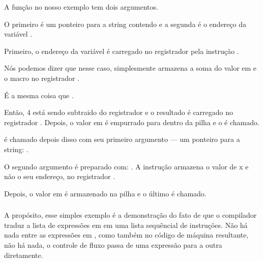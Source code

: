 A função \scanf no nosso exemplo tem dois argumentos.

O primeiro é um ponteiro para a string contendo  e a segunda é o endereço da variável .

Primeiro, o endereço da variável  é carregado no registrador \EAX pela instrução .

\ifx\LITE\undefined
\PTBRph{}
\fi

Nós podemos dizer que nesse caso, \LEA simplesmente armazena a soma do valor em \EBP e o macro  no registrador \EAX.

É a mesma coisa que .

Então, 4 está sendo subtraido do registrador \EBP e o resultado é carregado no registrador \EAX.
Depois, o valor em \EAX é empurrado para dentro da pilha e o \scanf é chamado.

\printf é chamado depois disso com seu primeiro argumento --- um ponteiro para a string:
.

O segundo argumento é preparado com: .
A instrução armazena o valor de x e não o seu endereço, no registrador \ECX.

Depois, o valor em \ECX é armazenado na pilha e o último \printf é chamado.


\subsubsection{\PTBRph{}}

A propósito, esse simples exemplo é a demonstração do fato de que o compilador traduz a lista de expressões em \CCpp em uma lista sequêncial de instruções.
Não há nada entre as expressões em \CCpp, como também no código de máquina resultante, não há nada, o controle de fluxo passa de uma expressão para a outra diretamente.

